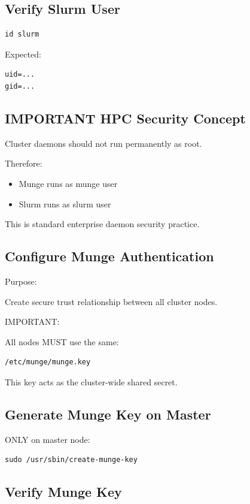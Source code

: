 \documentclass[11pt]{article}
\begin{document}
\subsection{Verify Slurm User}
\label{sec:org13810b9}

\begin{verbatim}
id slurm
\end{verbatim}

Expected:

\begin{verbatim}
uid=...
gid=...
\end{verbatim}
\subsection{IMPORTANT HPC Security Concept}
\label{sec:org8e20c9b}

Cluster daemons should not run permanently as root.

Therefore:

\begin{itemize}
\item Munge runs as munge user
\item Slurm runs as slurm user
\end{itemize}

This is standard enterprise daemon security practice.
\subsection{Configure Munge Authentication}
\label{sec:org4630901}

Purpose:

Create secure trust relationship between all cluster nodes.

IMPORTANT:

All nodes MUST use the same:

\begin{verbatim}
/etc/munge/munge.key
\end{verbatim}

This key acts as the cluster-wide shared secret.
\subsection{Generate Munge Key on Master}
\label{sec:orgfe5f43c}

ONLY on master node:

\begin{verbatim}
sudo /usr/sbin/create-munge-key
\end{verbatim}
\subsection{Verify Munge Key}
\label{sec:orgebc3dd3}
\end{document}
